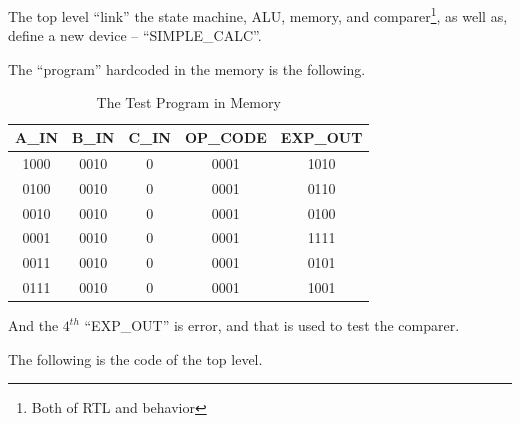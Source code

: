 \documentclass{article}
\begin{document}
    The top level ``link'' the state machine, ALU, memory, and comparer\footnote{Both of RTL and behavior}, 
    as well as, define a new device -- ``SIMPLE\_CALC''.
    
    The ``program'' hardcoded in the memory is the following.    
    \begin{table}[h!]
        \centering
        \begin{tabular}{|c|c|c|c|c|}
            \hline A\_IN & B\_IN & C\_IN & OP\_CODE & EXP\_OUT \\ 
            \hline 1000 & 0010 & 0 & 0001 & 1010 \\ 
            \hline 0100 & 0010 & 0 & 0001 & 0110 \\ 
            \hline 0010 & 0010 & 0 & 0001 & 0100 \\ 
            \hline 0001 & 0010 & 0 & 0001 & 1111 \\ 
            \hline 0011 & 0010 & 0 & 0001 & 0101 \\ 
            \hline 0111 & 0010 & 0 & 0001 & 1001 \\ 
            \hline 
        \end{tabular} 
        \caption{The Test Program in Memory}
    \end{table}
    And the $4^{th}$ ``EXP\_OUT'' is error, and that is used to test the comparer.
    
    The following is the code of the top level.
    
\end{document}
